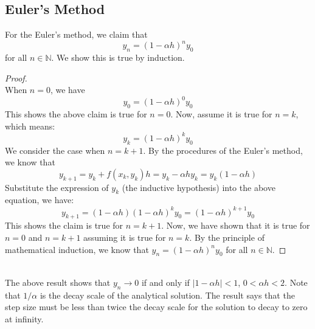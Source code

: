 \documentclass{article}
\def\NN{{\mathbb N}}
\begin{document}
\subsection{Euler's Method}
For the Euler's method, we claim that
\begin{equation}
  y_n = (1-\alpha h)^n y_0
\end{equation}
for all \(n\in \NN\). We show this is true by induction.
\begin{proof}\text{ }\\
  When \(n = 0\), we have
  \begin{equation}
    y_0 = (1- \alpha h)^0 y_0
  \end{equation}
  This shows the above claim is true for \(n=0\). Now, assume it is true for \(n=k\), which means:
  \begin{equation}
    y_k = (1-\alpha h)^k  y_0
  \end{equation}
  We consider the case when \(n=k+1\). By the procedures of the Euler's method, we know that
  \begin{equation}
    y_{k+1} = y_k + f(x_k, y_k)h = y_k - \alpha h y_k  = y_k (1-\alpha h)
  \end{equation}
  Substitute the expression of \(y_k\) (the inductive hypothesis) into the above equation, we have:
  \begin{equation}
    y_{k+1} = (1-\alpha h) (1-\alpha h)^k  y_0 = (1-\alpha h)^{k+1}  y_0
  \end{equation}
  This shows the claim is true for \(n=k+1\). Now, we have shown that it is true for \(n=0\) and \(n=k+1\) assuming it is true
  for \(n=k\). By the principle of mathematical induction, we know that \(y_n = (1-\alpha h)^n y_0\) for all \(n\in \NN\).
\end{proof}\text{ }\\
The above result shows that \(y_n \to 0\) if and only if \(|1-\alpha h|<1\), \(0<\alpha h <2\).
Note that \(1/\alpha\) is the decay scale of the analytical solution. The result says that the step size must be
less than twice the decay scale for the solution to decay to zero at infinity.
\pagebreak
\end{document}
